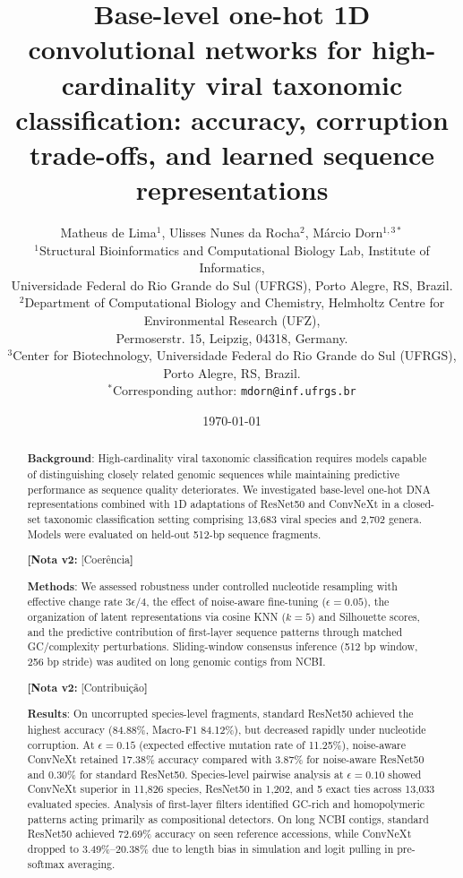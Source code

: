 \documentclass[11pt,a4paper]{article}
\title{\textbf{Base-level one-hot 1D convolutional networks for high-cardinality viral taxonomic classification: accuracy, corruption trade-offs, and learned sequence representations}}
\author{
  Matheus de Lima$^{1}$, Ulisses Nunes da Rocha$^{2}$, M\'{a}rcio Dorn$^{1,3*}$ \\[0.5em]
  \small $^{1}$Structural Bioinformatics and Computational Biology Lab, Institute of Informatics, \\
  \small Universidade Federal do Rio Grande do Sul (UFRGS), Porto Alegre, RS, Brazil. \\
  \small $^{2}$Department of Computational Biology and Chemistry, Helmholtz Centre for Environmental Research (UFZ), \\
  \small Permoserstr. 15, Leipzig, 04318, Germany. \\
  \small $^{3}$Center for Biotechnology, Universidade Federal do Rio Grande do Sul (UFRGS), Porto Alegre, RS, Brazil. \\[0.5em]
  \small $^{*}$Corresponding author: \texttt{mdorn@inf.ufrgs.br}
}
\date{\today}
\newcommand{\notavdois}[1]{\par\vspace{0.4em}\noindent\colorbox{yellow!25}{\begin{minipage}{0.96\linewidth}\footnotesize\textbf{[Nota v2:} #1\textbf{]}\end{minipage}}\par\vspace{0.4em}}
\begin{document}
\maketitle

\begin{abstract}
\noindent\textbf{Background}: High-cardinality viral taxonomic classification requires models capable of distinguishing closely related genomic sequences while maintaining predictive performance as sequence quality deteriorates. We investigated base-level one-hot DNA representations combined with 1D adaptations of ResNet50 and ConvNeXt in a closed-set taxonomic classification setting comprising 13,683 viral species and 2,702 genera. Models were evaluated on held-out 512-bp sequence fragments.

\notavdois{[Coerência}

\par\vspace{0.5em}\noindent\textbf{Methods}: We assessed robustness under controlled nucleotide resampling with effective change rate $3\epsilon/4$, the effect of noise-aware fine-tuning ($\epsilon=0.05$), the organization of latent representations via cosine KNN ($k=5$) and Silhouette scores, and the predictive contribution of first-layer sequence patterns through matched GC/complexity perturbations. Sliding-window consensus inference (512 bp window, 256 bp stride) was audited on long genomic contigs from NCBI.

\notavdois{[Contribuição}

\par\vspace{0.5em}\noindent\textbf{Results}: On uncorrupted species-level fragments, standard ResNet50 achieved the highest accuracy (84.88\%, Macro-F1 84.12\%), but decreased rapidly under nucleotide corruption. At $\epsilon = 0.15$ (expected effective mutation rate of 11.25\%), noise-aware ConvNeXt retained 17.38\% accuracy compared with 3.87\% for noise-aware ResNet50 and 0.30\% for standard ResNet50. Species-level pairwise analysis at $\epsilon=0.10$ showed ConvNeXt superior in 11,826 species, ResNet50 in 1,202, and 5 exact ties across 13,033 evaluated species. Analysis of first-layer filters identified GC-rich and homopolymeric patterns acting primarily as compositional detectors. On long NCBI contigs, standard ResNet50 achieved 72.69\% accuracy on seen reference accessions, while ConvNeXt dropped to 3.49\%--20.38\% due to length bias in simulation and logit pulling in pre-softmax averaging.


\end{abstract}
\end{document}
